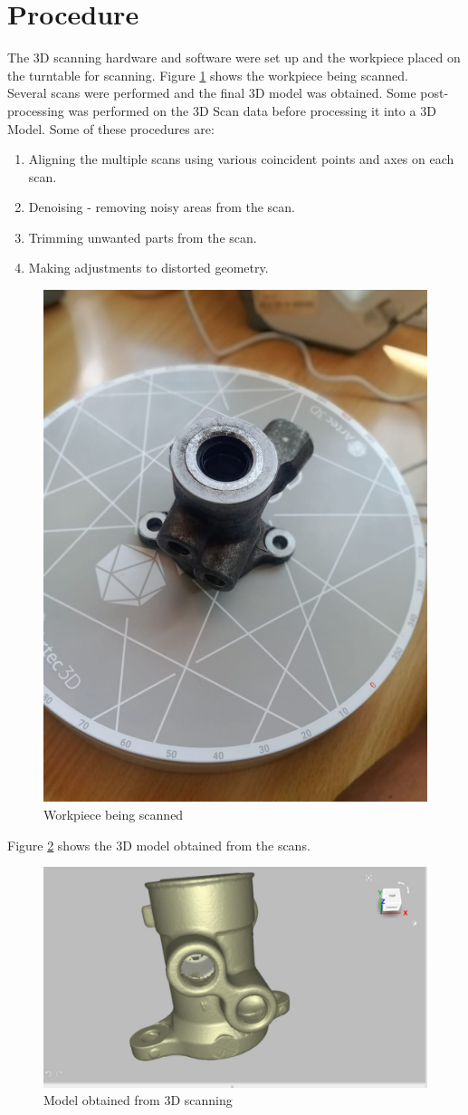 \section{Procedure}
The 3D scanning hardware and software were set up and the workpiece placed on the turntable for scanning. Figure \ref{fig:scanning} shows the workpiece being scanned.\\
Several scans were performed and the final 3D model was obtained. Some post-processing was performed on the 3D Scan data before processing it into a 3D Model. Some of these procedures are:
\begin{enumerate}
	\item Aligning the multiple scans using various coincident points and axes on each scan.
	\item Denoising - removing noisy areas from the scan.
	\item Trimming unwanted parts from the scan.
	\item Making adjustments to distorted geometry.
\end{enumerate} 
\begin{center}
 	\begin{figure}[h!]
 	\centering
 	\includegraphics[width=0.4\linewidth]{Figures/Figure 2}
 	\caption[Scanning]{Workpiece being scanned}
 	\label{fig:scanning}
 	\end{figure}
 \end{center}
Figure \ref{fig:scanned} shows the 3D model obtained from the scans.
 \begin{center}
 	\begin{figure}[!h]
 	\centering
 	\includegraphics[width=0.64\linewidth]{Figures/Figure 1}
 	\caption[Scanned 3D model]{Model obtained from 3D scanning}
 	\label{fig:scanned}
 	\end{figure}
 \end{center}
